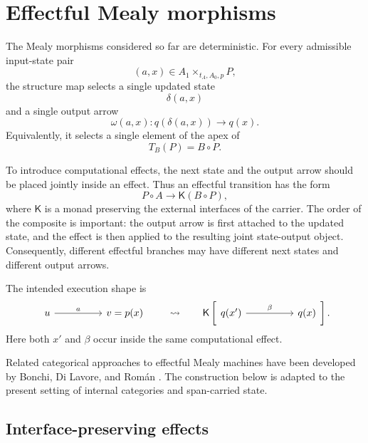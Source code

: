 \section{Effectful Mealy morphisms}
\label{sec:effectful-mealy-morphisms}

The Mealy morphisms considered so far are deterministic. For every admissible
input-state pair
\[
    (a,x)\in A_1\times_{t_A,A_0,p}P,
\]
the structure map selects a single updated state
\[
    \delta(a,x)
\]
and a single output arrow
\[
    \omega(a,x):
    q(\delta(a,x))\to q(x).
\]
Equivalently, it selects a single element of the apex of
\[
    T_B(P)=B\circ P.
\]

To introduce computational effects, the next state and the output arrow should
be placed jointly inside an effect. Thus an effectful transition has the form
\[
    P\circ A
    \longrightarrow
    \mathsf K(B\circ P),
\]
where \(\mathsf K\) is a monad preserving the external interfaces of the
carrier. The order of the composite is important: the output arrow is first
attached to the updated state, and the effect is then applied to the resulting
joint state-output object. Consequently, different effectful branches may have
different next states and different output arrows.

The intended execution shape is
\[
    \begin{tikzcd}[column sep=huge]
            u
                \arrow[r, "a"]
        &
            v=p(x)
    \end{tikzcd}
    \qquad\leadsto\qquad
    \mathsf K
    \left[
        \begin{tikzcd}[column sep=huge, baseline=-0.5ex]
                q(x')
                    \arrow[r, "\beta"]
            &
                q(x)
        \end{tikzcd}
    \right].
\]
Here both \(x'\) and \(\beta\) occur inside the same computational effect.

Related categorical approaches to effectful Mealy machines have been developed
by Bonchi, Di Lavore, and Román
\cite{BonchiDiLavoreRomanEffectfulMealyMachines}. The construction below is
adapted to the present setting of internal categories and span-carried state.

\subsection{Interface-preserving effects}
\label{subsec:interface-preserving-effects}

